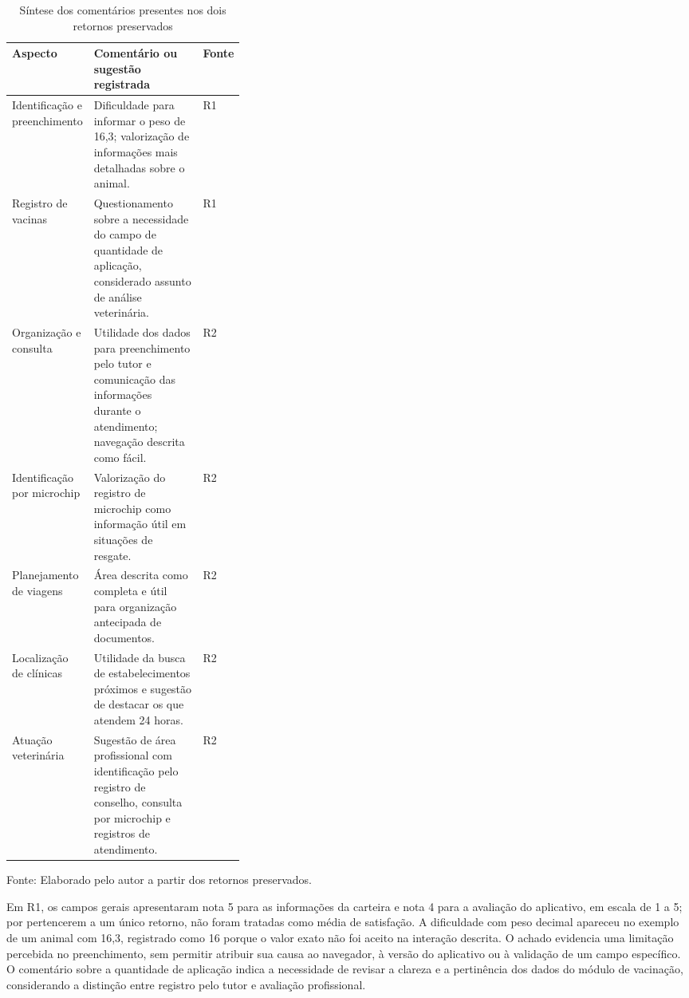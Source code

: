 \documentclass{UNESC}
\begin{document}
\begin{table}[htbp]
\centering
\caption{Síntese dos comentários presentes nos dois retornos preservados}
\label{tab:resumo_qualitativo}
\small
\setlength{\tabcolsep}{4pt}
\renewcommand{\arraystretch}{1.1}
\begin{tabular}{@{}p{0.24\linewidth} p{} p{0.10\linewidth}@{}}
\hline
\textbf{Aspecto} & \textbf{Comentário ou sugestão registrada} & \textbf{Fonte} \\
\hline
Identificação e preenchimento & Dificuldade para informar o peso de 16,3; valorização de informações mais detalhadas sobre o animal. & R1 \\
Registro de vacinas & Questionamento sobre a necessidade do campo de quantidade de aplicação, considerado assunto de análise veterinária. & R1 \\
Organização e consulta & Utilidade dos dados para preenchimento pelo tutor e comunicação das informações durante o atendimento; navegação descrita como fácil. & R2 \\
Identificação por microchip & Valorização do registro de microchip como informação útil em situações de resgate. & R2 \\
Planejamento de viagens & Área descrita como completa e útil para organização antecipada de documentos. & R2 \\
Localização de clínicas & Utilidade da busca de estabelecimentos próximos e sugestão de destacar os que atendem 24 horas. & R2 \\
Atuação veterinária & Sugestão de área profissional com identificação pelo registro de conselho, consulta por microchip e registros de atendimento. & R2 \\
\hline
\end{tabular}
\par\vspace{2pt}
{\footnotesize\raggedright Fonte: Elaborado pelo autor a partir dos retornos preservados.\par}
\end{table}

Em R1, os campos gerais apresentaram nota 5 para as informações da carteira e nota 4 para a avaliação do aplicativo, em escala de 1 a 5; por pertencerem a um único retorno, não foram tratadas como média de satisfação. A dificuldade com peso decimal apareceu no exemplo de um animal com 16,3, registrado como 16 porque o valor exato não foi aceito na interação descrita. O achado evidencia uma limitação percebida no preenchimento, sem permitir atribuir sua causa ao navegador, à versão do aplicativo ou à validação de um campo específico. O comentário sobre a quantidade de aplicação indica a necessidade de revisar a clareza e a pertinência dos dados do módulo de vacinação, considerando a distinção entre registro pelo tutor e avaliação profissional.
\end{document}
